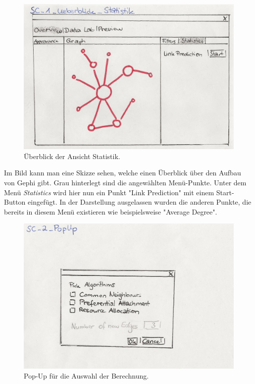 \begin{figure}[htbp]
    \includegraphics[width=\linewidth]{resources/SC-1.png}
    \caption{Überblick der Ansicht Statistik.}
    \label{fig:screen1}
\end{figure}

Im Bild kann man eine Skizze sehen, welche einen Überblick über den Aufbau von Gephi gibt. Grau hinterlegt sind die
angewählten Menü-Punkte. Unter dem Menü \textit{Statistics} wird hier nun ein Punkt "Link Prediction" mit einem
Start-Button eingefügt. In der Darstellung ausgelassen wurden die anderen Punkte, die bereits in diesem Menü existieren
wie beispielsweise "Average Degree".

\begin{figure}[htbp]
    \includegraphics[width=\linewidth]{resources/SC-2.png}
    \caption{Pop-Up für die Auswahl der Berechnung.}
    \label{fig:screen2}
\end{figure}

